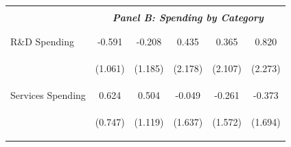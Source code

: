 \documentclass[dv_diss_main.tex]{subfiles}
\begin{document}
\begin{table}[H]
\begin{center}
\begin{tabular}{lccccc}
    \cmidrule{2-6}
    \vspace{-1.5pt} & \vspace{-1.5pt} & \vspace{-1.5pt} & \vspace{-1.5pt} & \vspace{-1.5pt} \\
    & \multicolumn{5}{c}{\textit{\textbf{Panel B: Spending by Category}}} \\ 
    \vspace{-1.5pt} & \vspace{-1.5pt} & \vspace{-1.5pt} & \vspace{-1.5pt} & \vspace{-1.5pt} \\ 
    \cmidrule{2-6}
    \vspace{-1.5pt} & \vspace{-1.5pt} & \vspace{-1.5pt} & \vspace{-1.5pt} & \vspace{-1.5pt} \\
    R\&D Spending & -0.591 & -0.208 & 0.435 & 0.365 & 0.820 \\
    \vspace{4pt} & \begin{footnotesize}(1.061)\end{footnotesize} & \begin{footnotesize}(1.185)\end{footnotesize} & \begin{footnotesize}(2.178)\end{footnotesize} & \begin{footnotesize}(2.107)\end{footnotesize} & \begin{footnotesize}(2.273)\end{footnotesize} \\
    Services Spending & 0.624 & 0.504 & -0.049 & -0.261 & -0.373 \\
    \vspace{4pt} & \begin{footnotesize}(0.747)\end{footnotesize} & \begin{footnotesize}(1.119)\end{footnotesize} & \begin{footnotesize}(1.637)\end{footnotesize} & \begin{footnotesize}(1.572)\end{footnotesize} & \begin{footnotesize}(1.694)\end{footnotesize} \\

\end{tabular}
\end{center}
\end{table}
\end{document}
